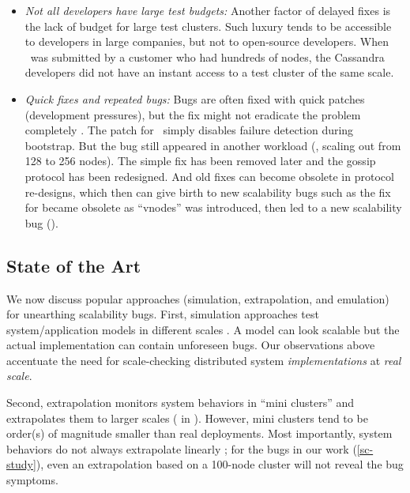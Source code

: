 \begin{itemize}
\item {\em Not all developers have large test budgets:}
%
Another factor of delayed fixes is the lack of budget for large
test clusters.  Such luxury tends to be accessible to developers
in large companies, but not to
open-source developers.  When
\caone\ was submitted by a customer who had hundreds of nodes, the
Cassandra developers did not have an instant access to a test cluster of
the same scale.

\item {\em Quick fixes and repeated bugs:} Bugs are often fixed with quick
patches (development pressures), but the fix might not eradicate the problem
completely \cite{Yin+11-FixesBecomeBugs}.
%
The patch for \caone\ simply disables failure detection during bootstrap. But
the bug still appeared in another workload (\eg, scaling out from 128 to 256
nodes).
%
The simple fix has been removed later and the gossip protocol has been
redesigned.
%
And old fixes can become obsolete in protocol re-designs, which then can give
birth to new scalability bugs such as the fix for  became obsolete as
``vnodes'' was introduced, then led to a new scalability bug ().

\end{itemize}

\subsection{State of the Art}

We now discuss popular approaches (simulation, extrapolation, and emulation) for
unearthing scalability bugs.
First, simulation approaches test system/application models in different scales
\cite{Calotoiu+13-ApmScaleBug, Laguna+15-DebugAtScale}. A model can look
scalable but the actual implementation can contain unforeseen bugs. Our
observations above accentuate the need for scale-checking distributed system
{\em implementations} at {\em real scale}.

Second, extrapolation monitors system behaviors in ``mini clusters'' and
extrapolates them to larger scales ( in \cite{Wang+14-Exalt}).  However,
mini clusters tend to be order(s) of magnitude smaller than real deployments.
Most importantly, system behaviors do not always extrapolate linearly
\cite{Wang+14-Exalt}; for the bugs in our work (\sec\ref{sc-study}), even an
extrapolation based on a 100-node cluster will not reveal the bug symptoms.

